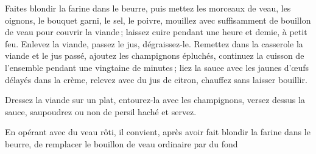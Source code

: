 Faites blondir la farine dans le beurre, puis mettez les morceaux de veau, les
oignons, le bouquet garni, le sel, le poivre, mouillez avec suffisamment de
bouillon de veau pour couvrir la viande ; laissez cuire pendant une heure et
demie, à petit feu. Enlevez la viande, passez le jus, dégraissez-le. Remettez
dans la casserole la viande et le jus passé, ajoutez les champignons épluchés,
continuez la cuisson de l’ensemble pendant une vingtaine de minutes ; liez la
sauce avec les jaunes d'œufs délayés dans la crème, relevez avec du jus de
citron, chauffez sans laisser bouillir.

Dressez la viande sur un plat, entourez-la avec les champignons, versez dessus
la sauce, saupoudrez ou non de persil haché et servez.

\sk

En opérant avec du veau rôti, il convient, après avoir fait blondir la farine
dans le beurre, de remplacer le bouillon de veau ordinaire par du fond
